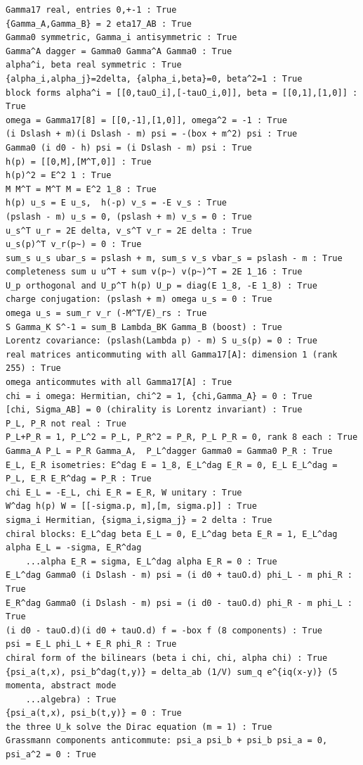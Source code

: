 \documentclass[10pt,a4paper]{article}
\begin{document}
\begin{Verbatim}[fontsize=\small,frame=single,framesep=2mm]
Gamma17 real, entries 0,+-1 : True
{Gamma_A,Gamma_B} = 2 eta17_AB : True
Gamma0 symmetric, Gamma_i antisymmetric : True
Gamma^A dagger = Gamma0 Gamma^A Gamma0 : True
alpha^i, beta real symmetric : True
{alpha_i,alpha_j}=2delta, {alpha_i,beta}=0, beta^2=1 : True
block forms alpha^i = [[0,tauO_i],[-tauO_i,0]], beta = [[0,1],[1,0]] : True
omega = Gamma17[8] = [[0,-1],[1,0]], omega^2 = -1 : True
(i Dslash + m)(i Dslash - m) psi = -(box + m^2) psi : True
Gamma0 (i d0 - h) psi = (i Dslash - m) psi : True
h(p) = [[0,M],[M^T,0]] : True
h(p)^2 = E^2 1 : True
M M^T = M^T M = E^2 1_8 : True
h(p) u_s = E u_s,  h(-p) v_s = -E v_s : True
(pslash - m) u_s = 0, (pslash + m) v_s = 0 : True
u_s^T u_r = 2E delta, v_s^T v_r = 2E delta : True
u_s(p)^T v_r(p~) = 0 : True
sum_s u_s ubar_s = pslash + m, sum_s v_s vbar_s = pslash - m : True
completeness sum u u^T + sum v(p~) v(p~)^T = 2E 1_16 : True
U_p orthogonal and U_p^T h(p) U_p = diag(E 1_8, -E 1_8) : True
charge conjugation: (pslash + m) omega u_s = 0 : True
omega u_s = sum_r v_r (-M^T/E)_rs : True
S Gamma_K S^-1 = sum_B Lambda_BK Gamma_B (boost) : True
Lorentz covariance: (pslash(Lambda p) - m) S u_s(p) = 0 : True
real matrices anticommuting with all Gamma17[A]: dimension 1 (rank 255) : True
omega anticommutes with all Gamma17[A] : True
chi = i omega: Hermitian, chi^2 = 1, {chi,Gamma_A} = 0 : True
[chi, Sigma_AB] = 0 (chirality is Lorentz invariant) : True
P_L, P_R not real : True
P_L+P_R = 1, P_L^2 = P_L, P_R^2 = P_R, P_L P_R = 0, rank 8 each : True
Gamma_A P_L = P_R Gamma_A,  P_L^dagger Gamma0 = Gamma0 P_R : True
E_L, E_R isometries: E^dag E = 1_8, E_L^dag E_R = 0, E_L E_L^dag = P_L, E_R E_R^dag = P_R : True
chi E_L = -E_L, chi E_R = E_R, W unitary : True
W^dag h(p) W = [[-sigma.p, m],[m, sigma.p]] : True
sigma_i Hermitian, {sigma_i,sigma_j} = 2 delta : True
chiral blocks: E_L^dag beta E_L = 0, E_L^dag beta E_R = 1, E_L^dag alpha E_L = -sigma, E_R^dag
    ...alpha E_R = sigma, E_L^dag alpha E_R = 0 : True
E_L^dag Gamma0 (i Dslash - m) psi = (i d0 + tauO.d) phi_L - m phi_R : True
E_R^dag Gamma0 (i Dslash - m) psi = (i d0 - tauO.d) phi_R - m phi_L : True
(i d0 - tauO.d)(i d0 + tauO.d) f = -box f (8 components) : True
psi = E_L phi_L + E_R phi_R : True
chiral form of the bilinears (beta i chi, chi, alpha chi) : True
{psi_a(t,x), psi_b^dag(t,y)} = delta_ab (1/V) sum_q e^{iq(x-y)} (5 momenta, abstract mode
    ...algebra) : True
{psi_a(t,x), psi_b(t,y)} = 0 : True
the three U_k solve the Dirac equation (m = 1) : True
Grassmann components anticommute: psi_a psi_b + psi_b psi_a = 0, psi_a^2 = 0 : True

\end{Verbatim}
\end{document}
